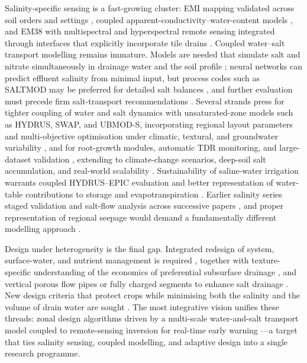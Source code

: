 \documentclass[11pt]{article}
\begin{document}
Salinity-specific sensing is a fast-growing cluster: EMI mapping validated across
soil orders and settings \parencite{Narjary2024}, coupled
apparent-conductivity--water-content models \parencite{Yu2025}, and EM38 with
multispectral and hyperspectral remote sensing integrated through interfaces that
explicitly incorporate tile drains \parencite{Singh2020d,Jayawardane2001}.
Coupled water--salt transport modelling remains immature. Models are needed that
simulate salt and nitrate simultaneously in drainage water and the soil profile
\parencite{Ebrahimian2015}; neural networks can predict effluent salinity from
minimal input, but process codes such as SALTMOD may be preferred for detailed
salt balances \parencite{Sarangi2006}, and further evaluation must precede firm
salt-transport recommendations \parencite{Hirekhan2007}. Several strands press
for tighter coupling of water and salt dynamics with unsaturated-zone models such
as HYDRUS, SWAP, and UBMOD-S, incorporating regional layout parameters and
multi-objective optimisation under climatic, textural, and groundwater
variability \parencite{Han2025,Wang2025c,Wang2024c}, and for root-growth modules,
automatic TDR monitoring, and large-dataset validation
\parencite{Liu2022}, extending to climate-change scenarios, deep-soil salt
accumulation, and real-world scalability \parencite{Liu2026}. Sustainability of
saline-water irrigation warrants coupled HYDRUS--EPIC evaluation
\parencite{Feng2019} and better representation of water-table contributions to
storage and evapotranspiration \parencite{Jia2017}. Earlier salinity series
staged validation and salt-flow analysis across successive papers
\parencite{KARAJEH1994}, and proper representation of regional seepage would
demand a fundamentally different modelling approach \parencite{Kelleners2000}.

Design under heterogeneity is the final gap. Integrated redesign of system,
surface-water, and nutrient management is required \parencite{vandenEertwegh2006},
together with texture-specific understanding of the economics of preferential
subsurface drainage \parencite{Neha2022}, and vertical porous flow pipes or fully
charged segments to enhance salt drainage
\parencite{Wang2024d,Yao2024,Jayawardane2001}. New design criteria that protect
crops while minimising both the salinity and the volume of drain water are sought
\parencite{Christen2001}. The most integrative vision unifies these threads:
zonal design algorithms driven by a multi-scale water-and-salt transport model
coupled to remote-sensing inversion for real-time early warning
\parencite{Zhu2025b}---a target that ties salinity sensing, coupled modelling, and
adaptive design into a single research programme.

\printbibliography
\end{document}
